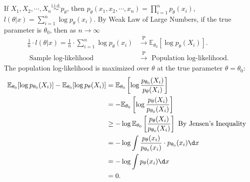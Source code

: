 \documentclass[a4paper]{article}
\begin{document}
\begin{note}
	If $X_1,X_2,\cdots,X_n \stackrel{\text{i.i.d.}}{\sim} p_{\theta}$, then $p_{\theta}(x_1,x_2,\cdots,x_n) = \prod\limits_{i=1}^n p_{\theta}(x_i)$, $l(\theta|x) = \sum\limits_{i=1}^n \log p_{\theta}(x_i)$. By Weak Law of Large Numbers, if the true parameter is $\theta_0$, then as $n \to \infty$ 
	\begin{equation}
		\begin{aligned}
			\frac{1}{n} \cdot l(\theta|x) = \frac{1}{n} \cdot \sum\limits_{i=1}^n \log p_{\theta}(x_i) & \stackrel{\text{P}}{\longrightarrow} \mathbb{E}_{\theta_0}[\log p_{\theta}(X_i)]. \\
			\text{ Sample log-likelihood } & \stackrel{\text{P}}{\longrightarrow} \text{ Population log-likelihood}.
		\end{aligned}
	\end{equation}
	The population log-likelihood is maximized over $\theta$ at the true parameter $\theta = \theta_0$:
	\begin{equation}
		\begin{aligned}
			\mathbb{E}_{\theta_0}[\log p_{\theta_0}(X_i)] - \mathbb{E}_{\theta_0}[\log p_{\theta}(X_i)] &= \mathbb{E}_{\theta_0}\left[\log \frac{p_{\theta_0}(X_i)}{p_{\theta}(X_i)}\right] \\
			&= - \mathbb{E}_{\theta_0}\left[\log \frac{p_{\theta}(X_i)}{p_{\theta_0}(X_i)}\right] \\
			&\geq - \log \mathbb{E}_{\theta_0}\left[\frac{p_{\theta}(X_i)}{p_{\theta_0}(X_i)}\right] \text{ By Jensen's Inequality } \\
			&= - \log \int \frac{p_{\theta}(x_i)}{p_{\theta_0}(x_i)} \cdot p_{\theta_0}(x_i) \d x \\
			&= - \log \int p_{\theta}(x_i) \d x \\
			&= 0.
		\end{aligned}
	\end{equation}
	\begin{center}
\end{center}
\end{note}
\end{document}
